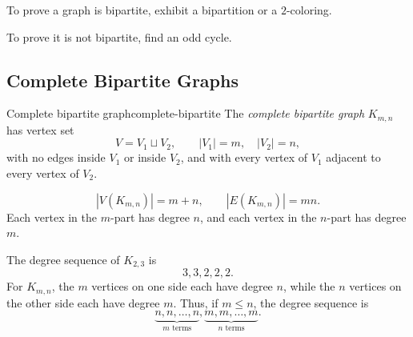 \begin{examtip}[title={Fast tests for bipartiteness}]
To prove a graph is bipartite, exhibit a bipartition or a \(2\)-coloring.

To prove it is not bipartite, find an odd cycle.
\end{examtip}

\subsection{Complete Bipartite Graphs}

\begin{definition}{Complete bipartite graph}{complete-bipartite}
The \emph{complete bipartite graph} \(K_{m,n}\) has vertex set
\[
V=V_1\sqcup V_2,
\qquad |V_1|=m,\quad |V_2|=n,
\]
with no edges inside \(V_1\) or inside \(V_2\), and with every vertex of \(V_1\) adjacent to every vertex of \(V_2\).
\end{definition}

\begin{keyformula}[title={Basic data for \(K_{m,n}\)}]
\[
|V(K_{m,n})|=m+n,
\qquad
|E(K_{m,n})|=mn.
\]
Each vertex in the \(m\)-part has degree \(n\), and each vertex in the \(n\)-part has degree \(m\).
\end{keyformula}

\begin{center}
\end{center}

\begin{examplebox}[title={Tutorial 9, Question 4}]
The degree sequence of \(K_{2,3}\) is
\[
3,3,2,2,2.
\]
For \(K_{m,n}\), the \(m\) vertices on one side each have degree \(n\), while the \(n\) vertices on the other side each have degree \(m\). Thus, if \(m\le n\), the degree sequence is
\[
\underbrace{n,n,\dots,n}_{m\text{ terms}},
\underbrace{m,m,\dots,m}_{n\text{ terms}}.
\]
\end{examplebox}

